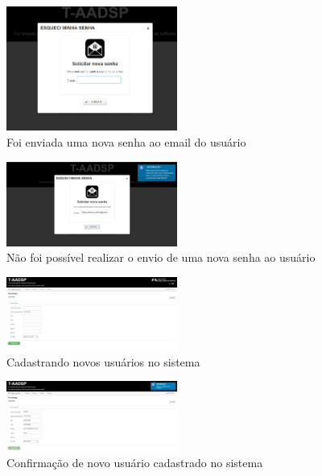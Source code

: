 \documentclass{acm_proc_article-sp}
\begin{document}
\begin{figure}[h]
\centering %
\includegraphics[width=0.5\textwidth]{RF_autenticacao_solicitar_nova_senha.jpg} %
\caption{Foi enviada uma nova senha ao email do usuário }
\end{figure}

\begin{figure}[h]
\centering %
\includegraphics[width=0.5\textwidth]{RF_autenticacao_falha_ao_enviar_senha.jpg} %
\caption{Não foi possível realizar o envio de uma nova senha ao usuário}
\end{figure}

\begin{figure}[h]
\centering %
\includegraphics[width=0.5\textwidth]{RF_cadastro_de_usuario.jpg} %
\caption{Cadastrando novos usuários no sistema}
\end{figure}

\begin{figure}[h]
\centering %
\includegraphics[width=0.5\textwidth]{RF_cadastro_de_usuario_realizado.jpg} %
\caption{Confirmação de novo usuário cadastrado no sistema}
\end{figure}
\end{document}
